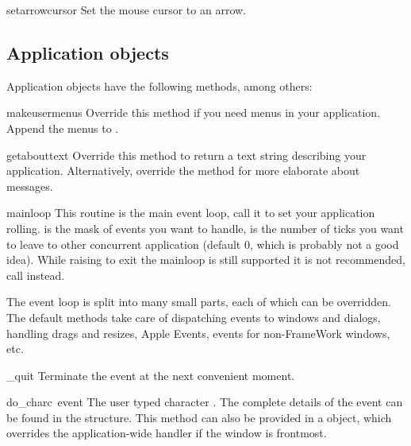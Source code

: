 \begin{funcdesc}{setarrowcursor}{}
Set the mouse cursor to an arrow.
\end{funcdesc}

\subsection{Application objects}
Application objects have the following methods, among others:

\renewcommand{\indexsubitem}{(Application method)}

\begin{funcdesc}{makeusermenus}{}
Override this method if you need menus in your application. Append the
menus to .
\end{funcdesc}

\begin{funcdesc}{getabouttext}{}
Override this method to return a text string describing your
application. Alternatively, override the  method for
more elaborate about messages.
\end{funcdesc}

\begin{funcdesc}{mainloop}{}
This routine is the main event loop, call it to set your application
rolling.  is the mask of events you want to handle,
 is the number of ticks you want to leave to other
concurrent application (default 0, which is probably not a good
idea). While raising  to exit the mainloop is still
supported it is not recommended, call  instead.

The event loop is split into many small parts, each of which can be
overridden. The default methods take care of dispatching events to
windows and dialogs, handling drags and resizes, Apple Events, events
for non-FrameWork windows, etc.
\end{funcdesc}

\begin{funcdesc}{_quit}{}
Terminate the event  at the next convenient moment.
\end{funcdesc}

\begin{funcdesc}{do_char}{c\, event}
The user typed character . The complete details of the event
can be found in the  structure. This method can also be
provided in a  object, which overrides the
application-wide handler if the window is frontmost.
\end{funcdesc}

